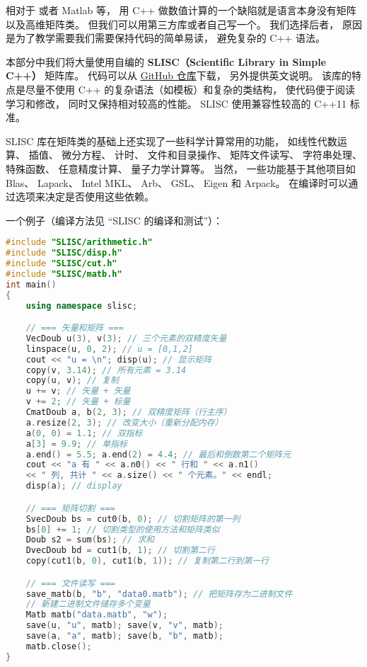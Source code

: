 

相对于  或者 Matlab 等， 用 C++ 做数值计算的一个缺陷就是语言本身没有矩阵以及高维矩阵类。 但我们可以用第三方库或者自己写一个。 我们选择后者， 原因是为了教学需要我们需要保持代码的简单易读， 避免复杂的 C++ 语法。

本部分中我们将大量使用自编的 \textbf{SLISC（Scientific Library in Simple C++）} 矩阵库。 代码可以从 \href{https://github.com/MacroUniverse/SLISC}{GitHub 仓库}下载， 另外提供英文说明。 该库的特点是尽量不使用 C++ 的复杂语法（如模板）和复杂的类结构， 使代码便于阅读学习和修改， 同时又保持相对较高的性能。 SLISC 使用兼容性较高的 C++11 标准。

SLISC 库在矩阵类的基础上还实现了一些科学计算常用的功能， 如线性代数运算、 插值、 微分方程、 计时、 文件和目录操作、 矩阵文件读写、 字符串处理、 特殊函数、 任意精度计算、 量子力学计算等。 当然， 一些功能基于其他项目如 Blas、 Lapack、 Intel MKL、 Arb、 GSL、 Eigen 和 Arpack。 在编译时可以通过选项来决定是否使用这些依赖。

一个例子（编译方法见 “SLISC 的编译和测试”）：
\begin{lstlisting}[language=cpp, caption=intro.cpp]
#include "SLISC/arithmetic.h"
#include "SLISC/disp.h"
#include "SLISC/cut.h"
#include "SLISC/matb.h"
int main()
{
	using namespace slisc;

	// === 矢量和矩阵 ===
	VecDoub u(3), v(3); // 三个元素的双精度矢量
	linspace(u, 0, 2); // u = [0,1,2]
	cout << "u = \n"; disp(u); // 显示矩阵
	copy(v, 3.14); // 所有元素 = 3.14
	copy(u, v); // 复制
	u += v; // 矢量 + 矢量
	v += 2; // 矢量 + 标量
	CmatDoub a, b(2, 3); // 双精度矩阵（行主序）
	a.resize(2, 3); // 改变大小（重新分配内存）
	a(0, 0) = 1.1; // 双指标
	a[3] = 9.9; // 单指标
	a.end() = 5.5; a.end(2) = 4.4; // 最后和倒数第二个矩阵元
	cout << "a 有 " << a.n0() << " 行和 " << a.n1()
	<< " 列, 共计 " << a.size() << " 个元素。" << endl;
	disp(a); // display

	// === 矩阵切割 ===
	SvecDoub bs = cut0(b, 0); // 切割矩阵的第一列
	bs[0] += 1; // 切割类型的使用方法和矩阵类似
	Doub s2 = sum(bs); // 求和
	DvecDoub bd = cut1(b, 1); // 切割第二行
	copy(cut1(b, 0), cut1(b, 1)); // 复制第二行到第一行

	// === 文件读写 ===
	save_matb(b, "b", "data0.matb"); // 把矩阵存为二进制文件
	// 新建二进制文件储存多个变量
	Matb matb("data.matb", "w");
	save(u, "u", matb); save(v, "v", matb);
	save(a, "a", matb); save(b, "b", matb);
	matb.close();
}
\end{lstlisting}

